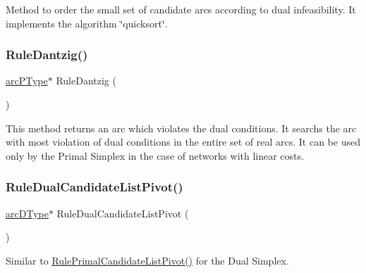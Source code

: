 Method to order the small set of candidate arcs according to dual infeasibility. It implements the algorithm \char`\"{}quicksort\char`\"{}. \mbox{\label{class_m_c_f_simplex_afd80a1b4c0c9efc6d596c01ba4812b66}} 
\subsubsection{\texorpdfstring{Rule\+Dantzig()}{RuleDantzig()}}
{\footnotesize\ttfamily \mbox{\hyperlink{struct_m_c_f_simplex_1_1arc_p_type}{arc\+P\+Type}}$\ast$ Rule\+Dantzig (\begin{DoxyParamCaption}\item[{void}]{ }\end{DoxyParamCaption})\hspace{0.3cm}{\ttfamily [private]}}

This method returns an arc which violates the dual conditions. It searchs the arc with most violation of dual conditions in the entire set of real arcs. It can be used only by the Primal Simplex in the case of networks with linear costs. \mbox{\label{class_m_c_f_simplex_add932371a119910c398ff47376e68b55}} 
\subsubsection{\texorpdfstring{Rule\+Dual\+Candidate\+List\+Pivot()}{RuleDualCandidateListPivot()}}
{\footnotesize\ttfamily \mbox{\hyperlink{struct_m_c_f_simplex_1_1arc_d_type}{arc\+D\+Type}}$\ast$ Rule\+Dual\+Candidate\+List\+Pivot (\begin{DoxyParamCaption}\item[{void}]{ }\end{DoxyParamCaption})\hspace{0.3cm}{\ttfamily [private]}}

Similar to \mbox{\hyperlink{class_m_c_f_simplex_ab48e077550e17654d21bca709e24f976}{Rule\+Primal\+Candidate\+List\+Pivot()}} for the Dual Simplex. \mbox{\label{class_m_c_f_simplex_ab48e077550e17654d21bca709e24f976}} 
